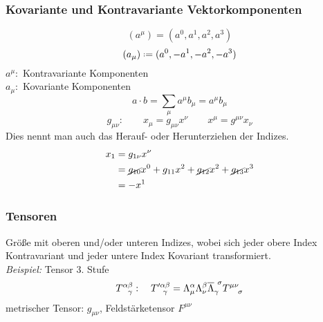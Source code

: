 \subsubsection{Kovariante und Kontravariante Vektorkomponenten}

\begin{equation*}
(a^{\mu}) = (a^0, a^1, a^2, a^3)
\end{equation*}
\begin{equation*}
(a_{\mu}) \defeq (a^0, -a^1, -a^2, -a^3)
\end{equation*}
$ a^{\mu} : $ Kontravariante Komponenten\\
$ a_{\mu} : $ Kovariante Komponenten
\begin{equation*}
a \cdot b = \sum_{\mu} a^{\mu} b_{\mu} = a^{\mu} b_{\mu}
\end{equation*}
$$ g_{\mu \nu} : \qquad x_{\mu} = g_{\mu \nu} x^{\nu} \qquad x^{\mu} = g^{\mu \nu} x_{\nu} $$
Dies nennt man auch das Herauf- oder Herunterziehen der Indizes.
\begin{align*}
x_1 &= g_{1 \nu} x^\nu\\
&= \cancel{g_{10}}x^0 + g_{11} x^2 + \cancel{g_{12}}x^2 + \cancel{g_{13}}x^3\\
&= - x^1
\end{align*}

\subsubsection{Tensoren}

Größe mit oberen und/oder unteren Indizes, wobei sich jeder obere Index Kontravariant und jeder untere Index Kovariant transformiert.\\[5pt]
\emph{Beispiel:} Tensor 3. Stufe
$$ T^{\alpha \beta}_{\ \ \gamma} : \quad T'^{\alpha \beta}_{\ \ \gamma} = \Lambda^{\alpha}_{\mu} \Lambda^{\beta}_{\nu} \overline{\Lambda}_{\gamma} ^{\ \sigma} T^{\mu \nu}_{\ \ \ \sigma} $$
metrischer Tensor: $ g_{\mu \nu} $, Feldstärketensor $ F^{\mu \nu} $
